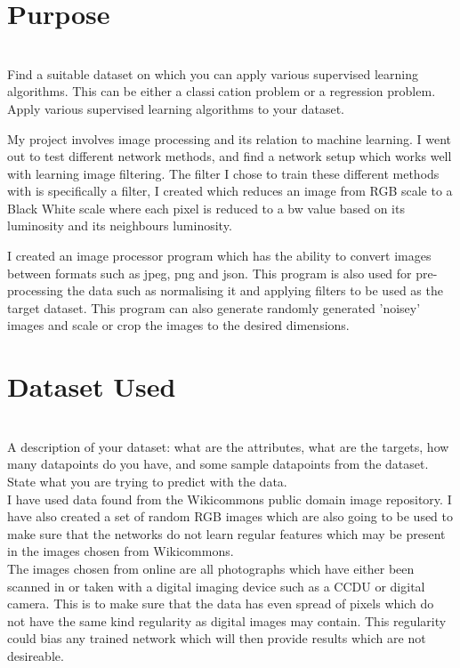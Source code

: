 \documentclass[11pt]{article}
\begin{document}
\begin{page}
\section{Purpose}
\\Find a suitable dataset on which you can apply various supervised learning algorithms.
This can be either a classication problem or a regression problem.
Apply various supervised learning algorithms to your dataset.

My project involves image processing and its relation to machine learning. I went out to test different network methods, and find a network setup which works well with learning image filtering. The filter I chose to train these different methods with is specifically a filter, I created which reduces an image from RGB scale to a Black White scale where each pixel is reduced to a bw value based on its luminosity and its neighbours luminosity.

I created an image processor program which has the ability to convert images between formats such as jpeg, png and json. This program is also used for pre-processing the data such as normalising it and applying filters to be used as the target dataset. This program can also generate randomly generated 'noisey' images and scale or crop the images to the desired dimensions.

\section{Dataset Used}
\\A description of your dataset: what are the attributes, what are the targets, how many
datapoints do you have, and some sample datapoints from the dataset. State what you are
trying to predict with the data.\\

I have used data found from the Wikicommons public domain image repository. I have also created a set of random RGB images which are also going to be used to make sure that the networks do not learn regular features which may be present in the images chosen from Wikicommons. \\

The images chosen from online are all photographs which have either been scanned in or taken with a digital imaging device such as a CCDU or digital camera. This is to make sure that the data has even spread of pixels which do not have the same kind regularity as digital images may contain. This regularity could bias any trained network which will then provide results which are not desireable.


\end{page}
\end{document}
